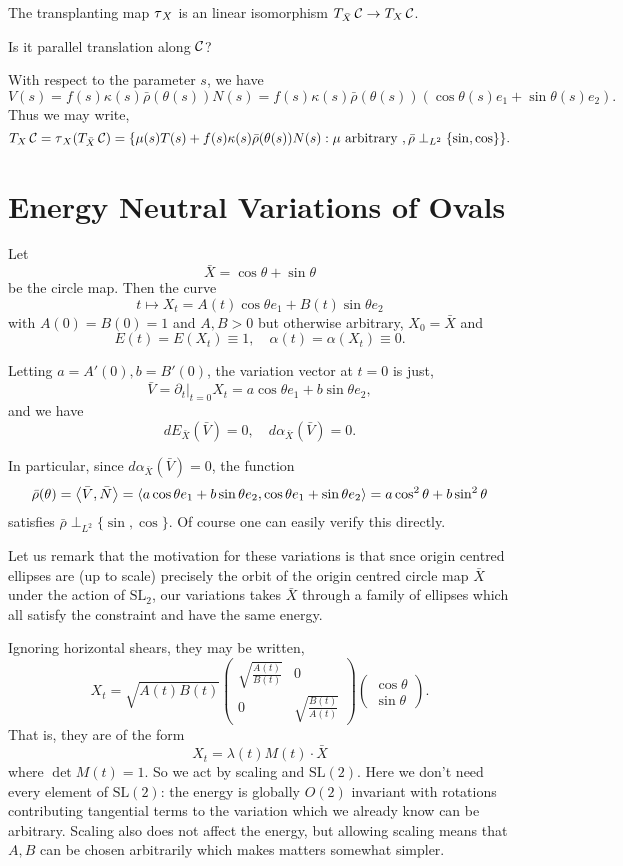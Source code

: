 \documentclass[12pt]{article}
\begin{document}
The transplanting map \(\operatorname{\tau}_X\) is an linear isomorphism \(T_{\bar{X}} \operatorname{\mathcal{C}} \to T_X \operatorname{\mathcal{C}}\).

{\color{red} Is it parallel translation along \(\operatorname{\mathcal{C}}\)?}

With respect to the parameter \(s\), we have
\[
V(s) = f(s) \kappa(s) \bar{\rho}(\theta(s)) N(s) = f(s) \kappa(s) \bar{\rho}(\theta(s))(\cos\theta(s) e_1 + \sin\theta(s) e_2).
\]
Thus we may write,
\[
T_X \operatorname{\mathcal{C}} = \operatorname{\tau}_X(T_{\bar{X}} \operatorname{\mathcal{C}}) = \{\mu(s) T(s) + f(s) \kappa(s) \bar{\rho}(\theta(s)) N(s) : \mu \text{ arbitrary }, \bar{\rho} \perp_{L^2} \{\sin, \cos\}\}.
\]

\section{Energy Neutral Variations of Ovals}

Let
\[
\bar{X} = \cos\theta + \sin \theta
\]
be the circle map. Then the curve
\[
t \mapsto X_t = A(t) \cos\theta e_1 + B(t) \sin \theta e_2
\]
with \(A(0) = B(0) = 1\) and \(A, B > 0\) but otherwise arbitrary, \(X_0 = \bar{X}\) and
\[
E(t) = E(X_t) \equiv 1, \quad \alpha(t) = \alpha(X_t) \equiv 0.
\]

Letting \(a = A'(0), b = B'(0)\), the variation vector at \(t = 0\) is just,
\[
\bar{V} = \partial_t|_{t=0} X_t = a \cos\theta e_1 + b \sin\theta e_2,
\]
and we have
\[
dE_{\bar{X}} (\bar{V}) = 0, \quad d\alpha_{\bar{X}} (\bar{V}) = 0.
\]

In particular, since \(d\alpha_{\bar{X}} (\bar{V}) = 0\), the function
\[
\bar{\rho} (\theta) = \left\langle{\bar{V}},{\bar{N}}\right\rangle = \left\langle{a \cos\theta e_1 + b \sin\theta e_2},{\cos\theta e_1 + \sin\theta e_2}\right\rangle = a \cos^2\theta + b \sin^2\theta
\]
satisfies \(\bar{\rho} \perp_{L^2} \{\sin, \cos\}\). Of course one can easily verify this directly.

Let us remark that the motivation for these variations is that snce origin centred ellipses are (up to scale) precisely the orbit of the origin centred circle map \(\bar{X}\) under the action of \(\text{SL}_2\), our variations takes \(\bar{X}\) through a family of ellipses which all satisfy the constraint and have the same energy.

Ignoring horizontal shears, they may be written,
\[
X_t = \sqrt{A(t) B(t)}
\begin{pmatrix}
\sqrt{\frac{A(t)}{B(t)}} & 0 \\
0 & \sqrt{\frac{B(t)}{A(t)}}
\end{pmatrix}
\begin{pmatrix}
\cos \theta \\
\sin \theta
\end{pmatrix}.
\]
That is, they are of the form
\[
X_t = \lambda(t) M(t) \cdot \bar{X}
\]
where \(\det M(t) = 1\). So we act by scaling and \(\text{SL}(2)\). Here we don't need every element of \(\text{SL}(2)\): the energy is globally \(O(2)\) invariant with rotations contributing tangential terms to the variation which we already know can be arbitrary. Scaling also does not affect the energy, but allowing scaling means that \(A, B\) can be chosen arbitrarily which makes matters somewhat simpler.
\end{document}
